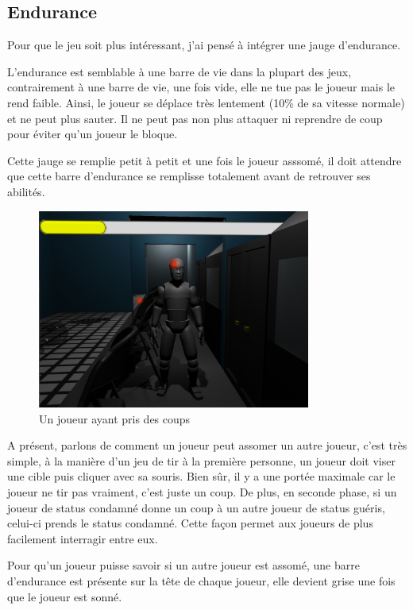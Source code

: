 \documentclass{article}
\begin{document}
\subsection{Endurance}

Pour que le jeu soit plus intéressant, j'ai pensé à intégrer une jauge d'endurance.

L'endurance est semblable à une barre de vie dans la plupart des jeux, contrairement à une barre de vie, une fois vide, elle ne tue pas le joueur mais le rend faible. Ainsi, le joueur se déplace très lentement (10\% de sa vitesse normale) et ne peut plus sauter. Il ne peut pas non plus attaquer ni reprendre de coup pour éviter qu'un joueur le bloque.

Cette jauge se remplie petit à petit et une fois le joueur asssomé, il doit attendre que cette barre d'endurance se remplisse totalement avant de retrouver ses abilités.

\begin{figure}[H]
    \centering
    \includegraphics[width=0.8\textwidth]{cc/stamina.png}
    \caption{Un joueur ayant pris des coups}
    \label{cc_a}
\end{figure}

A présent, parlons de comment un joueur peut assomer un autre joueur, c'est très simple, à la manière d'un jeu de tir à la première personne, un joueur doit viser une cible puis cliquer avec sa souris. Bien sûr, il y a une portée maximale car le joueur ne tir pas vraiment, c'est juste un coup. De plus, en seconde phase, si un joueur de status condamné donne un coup à un autre joueur de status guéris, celui-ci prends le status condamné. Cette façon permet aux joueurs de plus facilement interragir entre eux.

Pour qu'un joueur puisse savoir si un autre joueur est assomé, une barre d'endurance est présente sur la tête de chaque joueur, elle devient grise une fois que le joueur est sonné.
\end{document}
